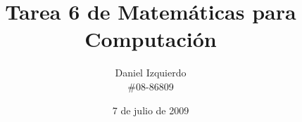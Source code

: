 \documentclass{article}
\begin{document}

\title{Tarea 6 de Matemáticas para Computación}
\author{Daniel Izquierdo \\ \#08-86809}
\date{7 de julio de 2009}

\maketitle

\section{}

\section{}

\section{}
\end{document}
